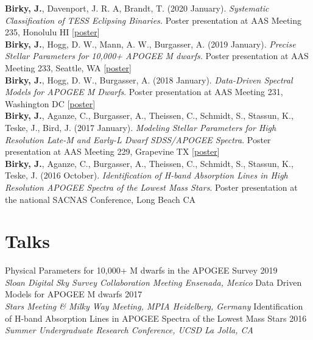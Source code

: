 \documentclass[margin,line]{resume}
\begin{document}
\begin{resume}
\textbf{Birky, J.}, Davenport, J. R. A, Brandt, T. (2020 January). \textsl{Systematic Classification of TESS Eclipsing Binaries.} Poster presentation at AAS Meeting 235, Honolulu HI [\href{https://doi.org/10.5281/zenodo.3605647}{poster}] \\
\newline
\textbf{Birky, J.}, Hogg, D. W., Mann, A. W., Burgasser, A. (2019 January). \textsl{Precise Stellar Parameters for 10,000+ APOGEE M dwarfs.} Poster presentation at AAS Meeting 233, Seattle, WA [\href{https://doi.org/10.5281/zenodo.2536586}{poster}] \\
\newline
\textbf{Birky, J.}, Hogg, D. W., Burgasser, A. (2018 January). \textit{Data-Driven Spectral Models for APOGEE M Dwarfs}. Poster presentation at AAS Meeting 231, Washington DC [\href{http://doi.org/10.5281/zenodo.1146909}{poster}] \\
\newline
\textbf{Birky, J.}, Aganze, C., Burgasser, A., Theissen, C., Schmidt, S., Stassun, K.,  Teske, J., Bird, J. (2017 January). \textsl{Modeling Stellar Parameters for High Resolution Late-M and Early-L Dwarf SDSS/APOGEE Spectra}. Poster presentation at AAS Meeting 229, Grapevine TX [\href{http://doi.org/10.5281/zenodo.1116625}{poster}]  \\
\newline
\textbf{Birky, J.}, Aganze, C., Burgasser, A., Theissen, C., Schmidt, S., Stassun, K.,  Teske, J. (2016 October). \textsl{Identification of H-band Absorption Lines in High Resolution APOGEE Spectra of the Lowest Mass Stars}. Poster presentation at the national SACNAS Conference, Long Beach CA 




\section{\mysidestyle \textcolor{bcolor}{Talks}}
Physical Parameters for 10,000+ M dwarfs in the APOGEE Survey \hfill 2019 \\ 
\textsl{Sloan Digital Sky Survey Collaboration Meeting \hfill Ensenada, Mexico}\vspace{.2cm} \newline
Data Driven Models for APOGEE M dwarfs \hfill 2017 \\ 
\textsl{Stars Meeting  \& Milky Way Meeting, MPIA \hfill Heidelberg, Germany}\vspace{.2cm} \newline
Identification of H-band Absorption Lines in APOGEE Spectra of the Lowest Mass Stars \hfill 2016 \\ 
\textsl{Summer Undergraduate Research Conference, UCSD \hfill La Jolla, CA}



\end{resume}
\end{document}
